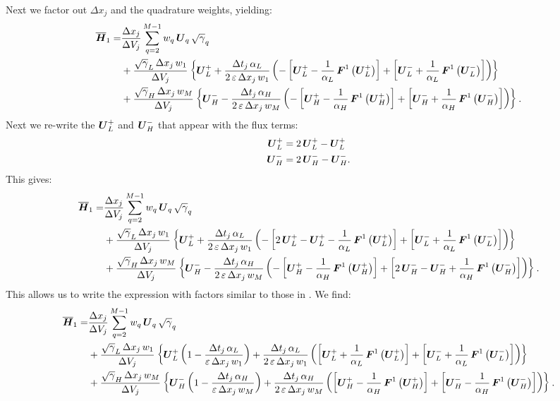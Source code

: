 Next we factor out $\Delta x_{j}$ and the quadrature weights, yielding:
\begin{align}
    \overline{\boldsymbol{H}}_{1}=&\frac{\Delta x_{j}}{\Delta V_{j}}\sum\limits_{q=2}^{M-1}w_{q}\,\boldsymbol{U}_{q}\,\sqrt{\gamma}_{q}\\
    &+\frac{\sqrt{\gamma}_{L}\,\Delta x_{j}\,w_{1}}{\Delta V_{j}}\left\{\boldsymbol{U}^{+}_{L}+\frac{\Delta t_{j}\,\alpha_{L}}{2\,\varepsilon\,\Delta x_{j}\,w_{1}}\left(-\left[\boldsymbol{U}^{+}_{L}-\frac{1}{\alpha_{L}}\,\boldsymbol{F}^{1}\left(\boldsymbol{U}^{+}_{L}\right)\right]+\left[\boldsymbol{U}^{-}_{L}+\frac{1}{\alpha_{L}}\,\boldsymbol{F}^{1}\left(\boldsymbol{U}^{-}_{L}\right)\right]\right)\right\}\\
    &+\frac{\sqrt{\gamma}_{H}\,\Delta x_{j}\,w_{M}}{\Delta V_{j}}\left\{\boldsymbol{U}^{-}_{H}-\frac{\Delta t_{j}\,\alpha_{H}}{2\,\varepsilon\,\Delta x_{j}\,w_{M}}\left(-\left[\boldsymbol{U}^{+}_{H}-\frac{1}{\alpha_{H}}\,\boldsymbol{F}^{1}\left(\boldsymbol{U}^{+}_{H}\right)\right]+\left[\boldsymbol{U}^{-}_{H}+\frac{1}{\alpha_{H}}\,\boldsymbol{F}^{1}\left(\boldsymbol{U}^{-}_{H}\right)\right]\right)\right\}.
\end{align}
Next we re-write the $\boldsymbol{U}^{+}_{L}$ and $\boldsymbol{U}^{-}_{H}$ that appear with the flux terms:
\begin{align}
    \boldsymbol{U}^{+}_{L}&=2\,\boldsymbol{U}^{+}_{L}-\boldsymbol{U}^{+}_{L}\\
    \boldsymbol{U}^{-}_{H}&=2\,\boldsymbol{U}^{-}_{H}-\boldsymbol{U}^{-}_{H}.
\end{align}
This gives:
\begin{align}
    \overline{\boldsymbol{H}}_{1}=&\frac{\Delta x_{j}}{\Delta V_{j}}\sum\limits_{q=2}^{M-1}w_{q}\,\boldsymbol{U}_{q}\,\sqrt{\gamma}_{q}\\
    &+\frac{\sqrt{\gamma}_{L}\,\Delta x_{j}\,w_{1}}{\Delta V_{j}}\left\{\boldsymbol{U}^{+}_{L}+\frac{\Delta t_{j}\,\alpha_{L}}{2\,\varepsilon\,\Delta x_{j}\,w_{1}}\left(-\left[2\,\boldsymbol{U}^{+}_{L}-\boldsymbol{U}^{+}_{L}-\frac{1}{\alpha_{L}}\,\boldsymbol{F}^{1}\left(\boldsymbol{U}^{+}_{L}\right)\right]+\left[\boldsymbol{U}^{-}_{L}+\frac{1}{\alpha_{L}}\,\boldsymbol{F}^{1}\left(\boldsymbol{U}^{-}_{L}\right)\right]\right)\right\}\\
    &+\frac{\sqrt{\gamma}_{H}\,\Delta x_{j}\,w_{M}}{\Delta V_{j}}\left\{\boldsymbol{U}^{-}_{H}-\frac{\Delta t_{j}\,\alpha_{H}}{2\,\varepsilon\,\Delta x_{j}\,w_{M}}\left(-\left[\boldsymbol{U}^{+}_{H}-\frac{1}{\alpha_{H}}\,\boldsymbol{F}^{1}\left(\boldsymbol{U}^{+}_{H}\right)\right]+\left[2\,\boldsymbol{U}^{-}_{H}-\boldsymbol{U}^{-}_{H}+\frac{1}{\alpha_{H}}\,\boldsymbol{F}^{1}\left(\boldsymbol{U}^{-}_{H}\right)\right]\right)\right\}.
\end{align}
This allows us to write the expression with factors similar to those in \citet{Qin2016}. We find:
\begin{align}
    \overline{\boldsymbol{H}}_{1}=&\frac{\Delta x_{j}}{\Delta V_{j}}\sum\limits_{q=2}^{M-1}w_{q}\,\boldsymbol{U}_{q}\,\sqrt{\gamma}_{q}\\
    &+\frac{\sqrt{\gamma}_{L}\,\Delta x_{j}\,w_{1}}{\Delta V_{j}}\left\{\boldsymbol{U}^{+}_{L}\left(1-\frac{\Delta t_{j}\,\alpha_{L}}{\varepsilon\,\Delta x_{j}\,w_{1}}\right)+\frac{\Delta t_{j}\,\alpha_{L}}{2\,\varepsilon\,\Delta x_{j}\,w_{1}}\left(\left[\boldsymbol{U}^{+}_{L}+\frac{1}{\alpha_{L}}\,\boldsymbol{F}^{1}\left(\boldsymbol{U}^{+}_{L}\right)\right]+\left[\boldsymbol{U}^{-}_{L}+\frac{1}{\alpha_{L}}\,\boldsymbol{F}^{1}\left(\boldsymbol{U}^{-}_{L}\right)\right]\right)\right\}\\
    &+\frac{\sqrt{\gamma}_{H}\,\Delta x_{j}\,w_{M}}{\Delta V_{j}}\left\{\boldsymbol{U}^{-}_{H}\left(1-\frac{\Delta t_{j}\,\alpha_{H}}{\varepsilon\,\Delta x_{j}\,w_{M}}\right)+\frac{\Delta t_{j}\,\alpha_{H}}{2\,\varepsilon\,\Delta x_{j}\,w_{M}}\left(\left[\boldsymbol{U}^{+}_{H}-\frac{1}{\alpha_{H}}\,\boldsymbol{F}^{1}\left(\boldsymbol{U}^{+}_{H}\right)\right]+\left[\boldsymbol{U}^{-}_{H}-\frac{1}{\alpha_{H}}\,\boldsymbol{F}^{1}\left(\boldsymbol{U}^{-}_{H}\right)\right]\right)\right\}.
\end{align}
